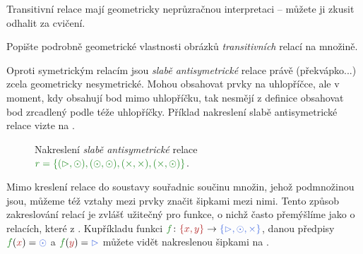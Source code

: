 Transitivní relace mají geometricky neprůzračnou interpretaci -- můžete ji
zkusit odhalit za cvičení.

\begin{hardExercise}
  Popište podrobně geometrické vlastnosti obrázků \emph{transitivních} relací na
  množině.
\end{hardExercise}

Oproti symetrickým relacím jsou \emph{slabě antisymetrické} relace právě
(překvápko...) zcela geometricky nesymetrické. Mohou obsahovat prvky na
uhlopříčce, ale v moment, kdy obsahují bod mimo uhlopříčku, tak nesmějí z
definice obsahovat bod zrcadlený podle téže uhlopříčky. Příklad nakreslení slabě
antisymetrické relace vizte na
.

\begin{figure}[ht]
  \centering

  \caption{Nakreslení \emph{slabě antisymetrické} relace $\clg{r =
      \{(\vartriangleright, \odot), (\odot, \odot), (\times, \times), (\times,
  \odot)\}}$.}
  \label{fig:nakresleni-slabe-antisymetricke-relace}
\end{figure}

Mimo kreslení relace do soustavy souřadnic součinu množin, jehož podmnožinou
jsou, můžeme též vztahy mezi prvky značit šipkami mezi nimi. Tento způsob
zakreslování relací je zvlášť užitečný pro funkce, o nichž často přemýšlíme jako
o relacích, které z .
Kupříkladu funkci $\clg{f}\colon \clr{\{x, y\}} \to \clb{\{\vartriangleright,
\odot, \times\}}$, danou předpisy $\clg{f}(\clr{x}) = \clb{\odot}$ a
$\clg{f}(\clr{y}) = \clb{\vartriangleright}$ můžete vidět nakreslenou šipkami na
.

